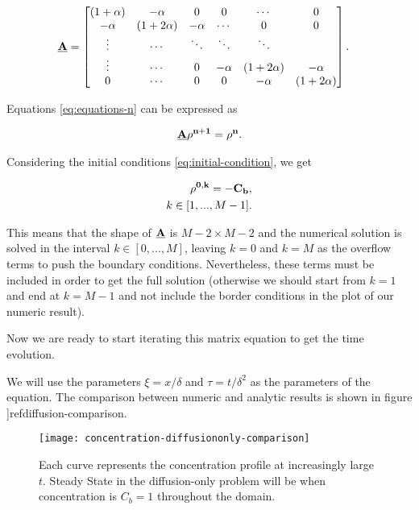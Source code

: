 \begin{align}
\bf{\underline{A}} &= \begin{bmatrix}
           ( 1 + \alpha ) & -\alpha  &  0 & 0 &  \cdots & 0\\
             -\alpha & ( 1 + 2 \alpha ) & -\alpha & \cdots & 0 & 0\\
           \vdots  &\cdots  & \ddots & \ddots &  \ddots&  \\
            \vdots & \cdots & 0  &  -\alpha & ( 1 + 2 \alpha ) & -\alpha \\
            0 & \cdots &0  & 0 & -\alpha & ( 1 + 2 \alpha )
         \end{bmatrix}
         \label{eq:discretization-matrix}.
\end{align}

Equations \ref{eq:equations-n} can be expressed as

\begin{align}
    \bf{\underline{A}} \bf{\rho^{n+1}}  = \bf{\rho^n} .
\end{align}

Considering the initial conditions \ref{eq:initial-condition}, we get

\begin{align}
    \bf{\rho^{0,k}} = -C_b, \\
    k \in [1,..., M-1].
\end{align}

This means that the shape of $\bf{\underline{A}}$ is $M-2 \times M-2$ and the numerical solution is solved in the interval  $k \in [0,..., M]$, leaving $k=0$ and $k=M$ as the overflow terms to push the boundary conditions. Nevertheless, these terms must be included in order to get the full solution (otherwise we should start from $k=1$ and end at $k=M-1$ and not include the border conditions in the plot of our numeric result).

Now we are ready to start iterating this matrix equation to get the time evolution.

We will use the parameters $\xi = x/\delta$ and $\tau = t/\delta^2$ as the parameters of the equation. The comparison between numeric and analytic results is shown in figure ]ref{diffusion-comparison}.

\begin{figure}[htbp]
\centering
\texttt{[image: concentration-diffusiononly-comparison]}
\caption{Each curve represents the concentration profile at increasingly large $t$. Steady State in the diffusion-only problem will be when concentration is $C_b=1$ throughout the domain.}
\label{fig:diffusion-comparison}
\end{figure}



